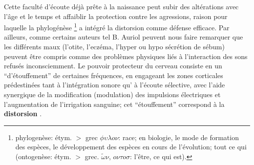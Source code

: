 Cette faculté d'écoute déjà prête à la naissance peut subir des
altérations avec l'âge et
le temps et affaiblir la protection contre les agressions, raison pour
laquelle la phylogénèse \footnote{ phylogenèse: étym. $>$ grec $\phi
  \upsilon \lambda o \nu $: race; en biologie, le mode de formation des espèces, le développement
  des espèces en cours de l'évolution; tout ce qui (ontogenèse:
  étym. $>$ grec. $\tilde{\omega}\nu$, $o \nu \tau o
  \sigma$: l'être,
ce qui est).}  a intégré la distorsion comme défense
efficace.
Par ailleurs, comme certains auteurs tel B. Auriol peuvent nous faire
remarquer que
les différents maux (l'otite, l'eczéma, l'hyper
ou hypo sécrétion de sébum) peuvent être compris comme des problèmes physiques liés à l'interaction des sons refusés
inconsciemment\autocite [19--20] {auriol:cle}.
Le pouvoir protecteur du cerveau consiste en un  ``d'étouffement'' de
certaines fréquences,  en engageant les zones corticales prédestinées
tant à
l'intégration sonore qu' à l'écoute sélective,  avec l'aide synergique de la
modification (modulation) des impulsions électriques et l'augmentation de
l'irrigation sanguine\autocite [14] {auriol:cle};
cet ``étouffement'' correspond à la \textbf{distorsion}
\autocite{tomatis:education}.



